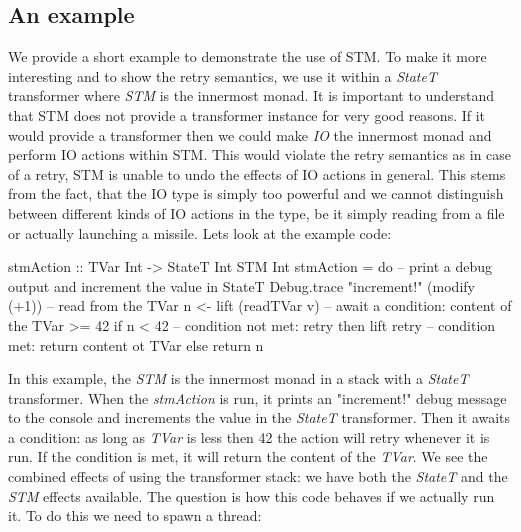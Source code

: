 \subsection{An example}
We provide a short example to demonstrate the use of STM. To make it more interesting and to show the retry semantics, we use it within a \textit{StateT} transformer where \textit{STM} is the innermost monad. It is important to understand that STM does not provide a transformer instance for very good reasons. If it would provide a transformer then we could make \textit{IO} the innermost monad and perform IO actions within STM. This would violate the retry semantics as in case of a retry, STM is unable to undo the effects of IO actions in general. This stems from the fact, that the IO type is simply too powerful and we cannot distinguish between different kinds of IO actions in the type, be it simply reading from a file or actually launching a missile. %
Lets look at the example code:

\begin{HaskellCode}
stmAction :: TVar Int -> StateT Int STM Int 
stmAction = do
  -- print a debug output and increment the value in StateT 
  Debug.trace "increment!" (modify (+1))
  -- read from the TVar
  n <- lift (readTVar v)
  -- await a condition: content of the TVar >= 42
  if n < 42
    -- condition not met: retry
    then lift retry
    -- condition met: return content ot TVar
    else return n
\end{HaskellCode}

In this example, the \textit{STM} is the innermost monad in a stack with a \textit{StateT} transformer. When the \textit{stmAction} is run, it prints an "increment!" debug message to the console and increments the value in the \textit{StateT} transformer. Then it awaits a condition: as long as \textit{TVar} is less then 42 the action will retry whenever it is run. If the condition is met, it will return the content of the \textit{TVar}. We see the combined effects of using the transformer stack: we have both the \textit{StateT} and the \textit{STM} effects available. The question is how this code behaves if we actually run it. To do this we need to spawn a thread:

